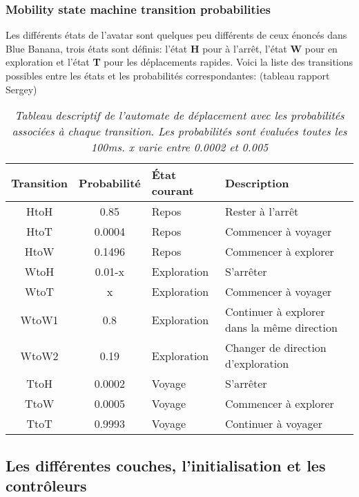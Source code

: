 \documentclass[11pt,a4paper]{article}
\begin{document}
\subsubsection{Mobility state machine transition probabilities}
\label{prob_var}
Les différents états de l'avatar sont quelques peu différents de ceux énoncés dans Blue Banana, trois états sont définis:
l'état \textbf{H} pour à l'arrêt, l'état \textbf{W} pour en exploration et l'état \textbf{T} pour les déplacements rapides.
Voici la liste des transitions possibles entre les états et les probabilités correspondantes: (tableau rapport Sergey)
\begin{table}[h!]
  \begin{center}
    \begin{tabular}{|c|c|l|l|}
      \hline
      Transition & Probabilité & État courant & Description\\
      \hline
      HtoH & 0.85 & Repos & Rester à l'arrêt\\
      HtoT & 0.0004 & Repos & Commencer à voyager\\
      HtoW & 0.1496 & Repos & Commencer à explorer\\
      WtoH & 0.01-x & Exploration & S'arrêter\\
      WtoT & x & Exploration & Commencer à voyager\\
      WtoW1 & 0.8 & Exploration & Continuer à explorer dans la même direction\\
      WtoW2 & 0.19 & Exploration & Changer de direction d'exploration\\
      TtoH & 0.0002 & Voyage & S'arrêter\\
      TtoW & 0.0005 & Voyage & Commencer à explorer\\
      TtoT & 0.9993 & Voyage & Continuer à voyager\\
      \hline
    \end{tabular}
  \end{center}
  \label{tab:automate}
  \caption{\textit{\small Tableau descriptif de l'automate de
      déplacement avec les probabilités associées à chaque
      transition. Les probabilités sont évaluées toutes les 100ms. x
      varie entre 0.0002 et 0.005}}
\end{table}

\subsection{Les différentes couches, l'initialisation et les contrôleurs}
\end{document}
